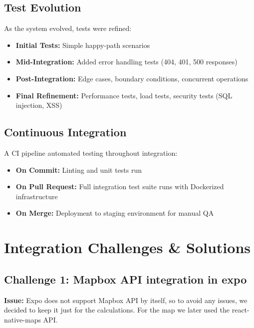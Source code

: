 \subsection{Test Evolution}
\label{subsec:test_evolution}

As the system evolved, tests were refined:

\begin{itemize}
    \item \textbf{Initial Tests:} Simple happy-path scenarios
    \item \textbf{Mid-Integration:} Added error handling tests (404, 401, 500 responses)
    \item \textbf{Post-Integration:} Edge cases, boundary conditions, concurrent operations
    \item \textbf{Final Refinement:} Performance tests, load tests, security tests (SQL injection, XSS)
\end{itemize}

\subsection{Continuous Integration}
\label{subsec:ci_pipeline}

A CI pipeline automated testing throughout integration:

\begin{itemize}
    \item \textbf{On Commit:} Linting and unit tests run
    \item \textbf{On Pull Request:} Full integration test suite runs with Dockerized infrastructure
    \item \textbf{On Merge:} Deployment to staging environment for manual QA
\end{itemize}

\section{Integration Challenges \& Solutions}
\label{sec:integration_challenges}

\subsection{Challenge 1: Mapbox API integration in expo}
\label{subsec:challenge_mapbox_expo}

\textbf{Issue:} Expo does not support Mapbox API by itself, so to avoid any issues, we decided to keep it just for the calculations. For the map we later used the react-native-maps API.

